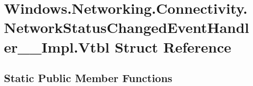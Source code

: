 \hypertarget{struct_windows_1_1_networking_1_1_connectivity_1_1_network_status_changed_event_handler_____impl_1_1_vtbl}{}\section{Windows.\+Networking.\+Connectivity.\+Network\+Status\+Changed\+Event\+Handler\+\_\+\+\_\+\+Impl.\+Vtbl Struct Reference}
\label{struct_windows_1_1_networking_1_1_connectivity_1_1_network_status_changed_event_handler_____impl_1_1_vtbl}
\subsection*{Static Public Member Functions}

